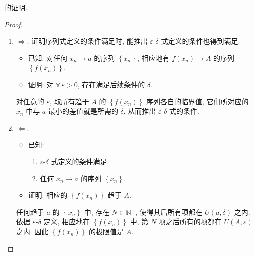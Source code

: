 \documentclass{book}
\newcommand{\Any}{\forall\,}
\newcommand{\set}[1]{\left\{#1\right\}}
\newcommand{\N}{\mathbb{N}}
\newcommand{\puncU}[1]{\check{U}\!\left( #1 \right)}
\renewcommand{\U}[1]{U\!\left( #1 \right)}%
\numberwithin{equation}{section}
\numberwithin{figure}{section}
\theoremstyle{definition}
\begin{document}
 的\hypertarget{proof:EquivalenceFunctionLimit}{证明}.
\begin{proof}
  \leavevmode

  \begin{enumerate}
    \item $\Rightarrow$. 证明序列式定义的条件满足时, 能推出 $\varepsilon$-$\delta$ 式定义的条件也得到满足.
      \begin{itemize}
	\item  已知: 对任何 $x_n\to a$ 的序列 $\set{x_n}$, 相应地有 $f(x_n)\to A$ 的序列 $\set{f(x_n)}$.
	\item 证明: 对 $\Any \varepsilon>0$, 存在满足后续条件的 $\delta$.
      \end{itemize}

      对任意的 $\varepsilon$, 取所有趋于 $A$ 的 $\set{f(x_n)}$ 序列各自的临界值, 它们所对应的 $x_n$ 中与 $a$ 最小的差值就是所需的 $\delta$, 从而推出 $\varepsilon$-$\delta$ 式的条件.

    \item $\Leftarrow$.
      \begin{itemize}
	\item 已知: 
	  \begin{enumerate}
	    \item $\varepsilon$-$\delta$ 式定义的条件满足.
	    \item 任何 $x_n\to a$ 的序列 $\set{x_n}$.
	  \end{enumerate}
	\item 证明: 相应的 $\set{f(x_n)}$ 趋于 $A$.
      \end{itemize}

      任何趋于 $a$ 的 $\set{x_n}$ 中, 存在 $N\in\N^+$, 使得其后所有项都在 $\puncU{a,\delta}$ 之内. 依据 $\varepsilon$-$\delta$ 定义, 相应地在 $\set{f(x_n)}$ 中, 第 $N$ 项之后所有的项都在 $\U{A,\varepsilon}$ 之内. 因此 $\set{f(x_n)}$ 的极限值是 $A$.
  \end{enumerate}
\end{proof}
\end{document}
